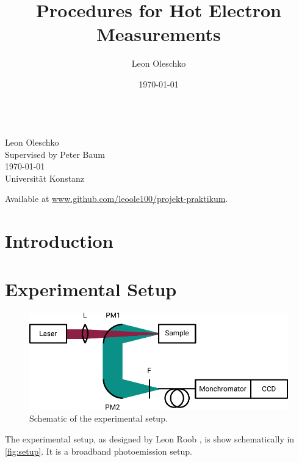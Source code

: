 \documentclass[
	parskip=half,
	a4paper,
]{scrarticle}
\begin{document}
\title{Procedures for Hot Electron Measurements}
\author{Leon Oleschko}
\date{\dotdate\today}

\begin{titlepage}
    \sffamily
    \vspace*{3cm}
    {
        \fontsize{32}{32}
    }
    \vspace{.25cm}\\
    {
        \Large
        Leon Oleschko\\
        Supervised by Peter Baum
        \vspace{.05cm}\\
        \dotdate\today\\
        Universität Konstanz
    }
    \vfill
    {
        \normalfont\normalsize

    }
    \vfill
    \begin{flushright}
        Available at \url{www.github.com/leoole100/projekt-praktikum}.
    \end{flushright}
\end{titlepage}


\clearpage


\section{Introduction}

\clearpage
\section{Experimental Setup}
\begin{figure}[hb]
    \centering
    \includegraphics{figures/setup.pdf}
    \caption{Schematic of the experimental setup.}
    \label{fig:setup}
\end{figure}
The experimental setup, as designed by Leon Roob \cite{roob_thermal_2025}, is show schematically in \autoref{fig:setup}.
It is a broadband photoemission setup.
\end{document}
